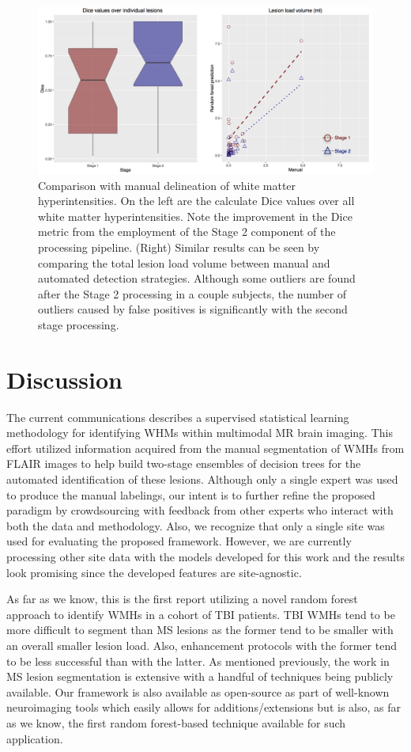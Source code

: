 \documentclass[11pt,]{article}
\begin{document}
\begin{figure}[htbp]
\centering
\includegraphics{Figures/llvAndDice.png}
\caption{Comparison with manual delineation of white matter
hyperintensities. On the left are the calculate Dice values over all
white matter hyperintensities. Note the improvement in the Dice metric
from the employment of the Stage 2 component of the processing pipeline.
(Right) Similar results can be seen by comparing the total lesion load
volume between manual and automated detection strategies. Although some
outliers are found after the Stage 2 processing in a couple subjects,
the number of outliers caused by false positives is significantly with
the second stage processing.}
\end{figure}

\section{Discussion}\label{discussion}

The current communications describes a supervised statistical learning
methodology for identifying WHMs within multimodal MR brain imaging.
This effort utilized information acquired from the manual segmentation
of WMHs from FLAIR images to help build two-stage ensembles of decision
trees for the automated identification of these lesions. Although only a
single expert was used to produce the manual labelings, our intent is to
further refine the proposed paradigm by crowdsourcing with feedback from
other experts who interact with both the data and methodology. Also, we
recognize that only a single site was used for evaluating the proposed
framework. However, we are currently processing other site data with the
models developed for this work and the results look promising since the
developed features are site-agnostic.

As far as we know, this is the first report utilizing a novel random
forest approach to identify WMHs in a cohort of TBI patients. TBI WMHs
tend to be more difficult to segment than MS lesions as the former tend
to be smaller with an overall smaller lesion load. Also, enhancement
protocols with the former tend to be less successful than with the
latter. As mentioned previously, the work in MS lesion segmentation is
extensive with a handful of techniques being publicly available. Our
framework is also available as open-source as part of well-known
neuroimaging tools which easily allows for additions/extensions but is
also, as far as we know, the first random forest-based technique
available for such application.
\end{document}
